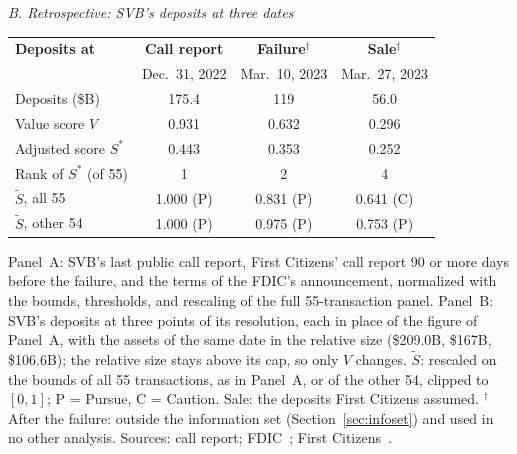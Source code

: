 \begin{table}[!t]
\vspace{6pt}
\textit{B. Retrospective: SVB's deposits at three dates}\\[2pt]
\setlength{\tabcolsep}{4pt}
\begin{tabular}{lccc}
\toprule
\textbf{Deposits at} & \textbf{Call report} & \textbf{Failure}$^{\dagger}$ & \textbf{Sale}$^{\dagger}$ \\
 & Dec.~31, 2022 & Mar.~10, 2023 & Mar.~27, 2023 \\
\midrule
Deposits (\$B) & 175.4 & 119 & 56.0 \\
Value score $V$ & 0.931 & 0.632 & 0.296 \\
Adjusted score $S^*$ & 0.443 & 0.353 & 0.252 \\
Rank of $S^*$ (of 55) & 1 & 2 & 4 \\
$\tilde S$, all 55 & 1.000 (P) & 0.831 (P) & 0.641 (C) \\
$\tilde S$, other 54 & 1.000 (P) & 0.975 (P) & 0.753 (P) \\
\bottomrule
\end{tabular}
\par\vspace{2pt}\parbox{0.94\columnwidth}{\scriptsize Panel~A: SVB's last public call report, First Citizens' call report 90 or
more days before the failure, and the terms of the FDIC's announcement, normalized with the bounds, thresholds, and rescaling of
the full 55-transaction panel. Panel~B: SVB's deposits at three points of its resolution, each in place of the figure of Panel~A,
with the assets of the same date in the relative size (\$209.0B, \$167B, \$106.6B); the relative size stays above its cap, so only $V$ changes. $\tilde S$:
rescaled on the bounds of all 55 transactions, as in Panel~A, or of the other 54, clipped to $[0, 1]$; P = Pursue, C = Caution.
Sale: the deposits First Citizens assumed. $^{\dagger}$After the failure: outside the information set (Section~\ref{sec:infoset}) and used in no other analysis.
Sources: call report; FDIC~\cite{fdic2023svb}; First Citizens~\cite{firstcitizens2023}.}
\end{table}
